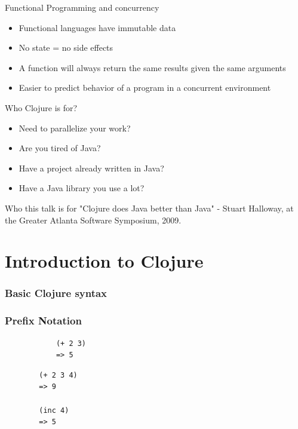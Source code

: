 \documentclass[xcolor=dvipsnames]{beamer}
\begin{document}
	\begin{frame}{Functional Programming and concurrency}
		\begin{itemize}
		\item Functional languages have immutable data
		\item No state = no side effects
		\item A function will always return the same results given the same arguments
		\item Easier to predict behavior of a program in a concurrent environment
		\end{itemize}
	\end{frame}
	
	\begin{frame}{Who Clojure is for?}
			\begin{itemize}
				\item Need to parallelize your work?
				\item Are you tired of Java?
		\pause
				\item Have a project already written in Java?
				\item Have a Java library you use a lot?
			\end{itemize}
	\end{frame}
	
	\begin{frame}{Who this talk is for}
	"Clojure does Java better than Java" - Stuart Halloway, at the Greater Atlanta Software Symposium, 2009.
	\end{frame}
		
	\begin{frame}
		\tableofcontents
	\end{frame}
	
	\section{Introduction to Clojure}
		\subsubsection{Basic Clojure syntax}
		\begin{frame}[fragile]
		\frametitle{Prefix Notation}
		\begin{verbatim}
			(+ 2 3)
			=> 5
		\end{verbatim}
		\pause
		\begin{verbatim}
		(+ 2 3 4)
		=> 9

		(inc 4)
		=> 5
		\end{verbatim}
		\end{frame}
\end{document}
